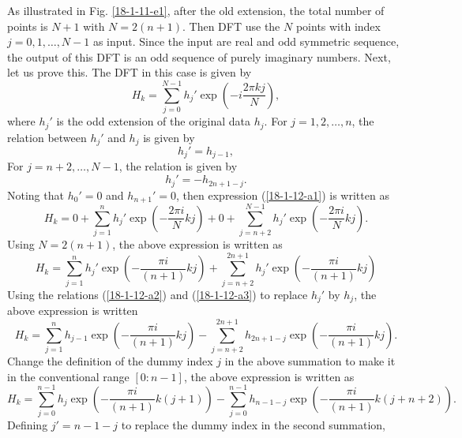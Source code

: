 \documentclass{article}
\begin{document}
As illustrated in Fig. \ref{18-1-11-e1}, after the old extension, the total
number of points is $N + 1$ with $N = 2 (n + 1)$. Then DFT use the $N$ points
with index $j = 0, 1, \ldots, N - 1$ as input. Since the input are real and
odd symmetric sequence, the output of this DFT is an odd sequence of purely
imaginary numbers. Next, let us prove this. The DFT in this case is given by
\begin{equation}
  \label{18-1-12-a1} H_k = \sum_{j = 0}^{N - 1} h_j' \exp \left( - i \frac{2
  \pi k j}{N}  \right),
\end{equation}
where $h_j'$ is the odd extension of the original data $h_j$. For $j = 1, 2,
\ldots, n$, the relation between $h_j'$ and $h_j$ is given by
\begin{equation}
  \label{18-1-12-a2} h_j' = h_{j - 1},
\end{equation}
For $j = n + 2, \ldots, N - 1$, the relation is given by
\begin{equation}
  \label{18-1-12-a3} h_j' {= - h_{2 n + 1 - j}}  .
\end{equation}
Noting that $h_0' = 0$ and $h_{n + 1}' = 0$, then expression
(\ref{18-1-12-a1}) is written as
\begin{equation}
  H_k = 0 + \sum_{j = 1}^n h_j' \exp \left( - \frac{2 \pi i}{N} k j \right) +
  0 + \sum_{j = n + 2}^{N - 1} h_j' \exp \left( - \frac{2 \pi i}{N} k j
  \right) .
\end{equation}
Using $N = 2 (n + 1)$, the above expression is written as
\begin{equation}
  H_k = \sum_{j = 1}^n h_j' \exp \left( - \frac{\pi i}{(n + 1)} k j \right) +
  \sum_{j = n + 2}^{2 n + 1} h_j' \exp \left( - \frac{\pi i}{(n + 1)} k j
  \right)
\end{equation}
Using the relations (\ref{18-1-12-a2}) and (\ref{18-1-12-a3}) to replace
$h_j'$ by $h_j$, the above expression is written
\begin{equation}
  H_k = \sum_{j = 1}^n h_{j - 1} \exp \left( - \frac{\pi i}{(n + 1)} k j
  \right) - \sum_{j = n + 2}^{2 n + 1} h_{2 n + 1 - j} \exp \left( - \frac{\pi
  i}{(n + 1)} k j \right) .
\end{equation}
Change the definition of the dummy index $j$ in the above summation to make it
in the conventional range $[0 : n - 1]$, the above expression is written as
\[ H_k = \sum_{j = 0}^{n - 1} h_j \exp \left( - \frac{\pi i}{(n + 1)} k (j +
   1) \right) - \sum_{j = 0}^{n - 1} h_{n - 1 - j} \exp \left( - \frac{\pi
   i}{(n + 1)} k (j + n + 2) \right) . \]
Defining $j' = n - 1 - j$ to replace the dummy index in the second summation,
\end{document}

